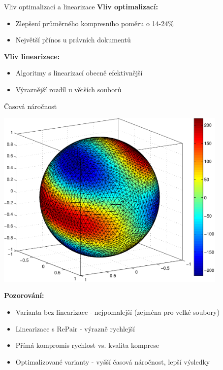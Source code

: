 \documentclass[lualatex,hyperref={pdfencoding=auto}]{beamer}
\begin{document}
\begin{frame}{Vliv optimalizací a linearizace}
  \textbf{Vliv optimalizací:}
  \begin{itemize}
    \item Zlepšení průměrného kompresního poměru o 14-24\%
    \item Největší přínos u právních dokumentů
  \end{itemize}
  \textbf{Vliv linearizace:}
  \begin{itemize}
    \item Algoritmy s linearizací obecně efektivnější
    \item Výraznější rozdíl u větších souborů
  \end{itemize}
\end{frame}

\begin{frame}{Časová náročnost}
  \begin{center}
    \includegraphics[width=0.85\textwidth]{fig/sphere_mix_real.pdf}
  \end{center}
  \vspace{2mm}
  \textbf{Pozorování:}
  \begin{itemize}
    \item Varianta bez linearizace - nejpomalejší (zejména pro velké soubory)
    \item Linearizace s RePair - výrazně rychlejší
    \item Přímá kompromis rychlost vs. kvalita komprese
    \item Optimalizované varianty - vyšší časová náročnost, lepší výsledky
  \end{itemize}
\end{frame}
\end{document}
